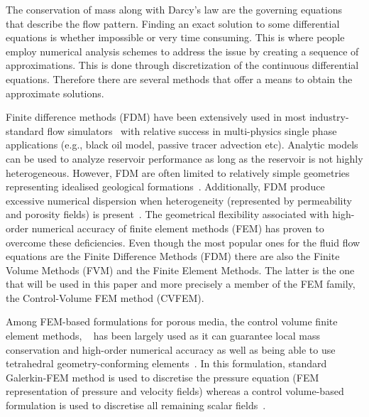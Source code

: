 \documentclass[preprint,authoryear,12pt]{elsarticle}
\begin{document}
\medskip
The conservation of mass along with Darcy's law are the governing equations that describe the flow pattern. Finding an exact solution to some differential  equations is whether impossible or very time consuming. This is where people employ numerical analysis schemes to address the issue by creating a sequence  of approximations. This is done through discretization of the continuous differential equations. Therefore there are several methods that offer a means to obtain the approximate solutions.

\medskip 
Finite difference methods (FDM) have been extensively used in most industry-standard flow simulators~\citep{aziz_1986, chen_2005, chang_1990} with relative success in multi-physics single phase applications (e.g., black oil model, passive tracer advection etc). Analytic models can be used to analyze reservoir performance as long as the reservoir is not highly heterogeneous. However, FDM are often limited to relatively simple geometries 
representing idealised geological formations~\citep{mlacnik_2004, king_1999}. Additionally, FDM produce excessive numerical dispersion when heterogeneity (represented by permeability and porosity fields) is present~\citep{chavent_1986}. The geometrical flexibility associated with high-order numerical accuracy of finite element methods (FEM) has proven to overcome these deficiencies. Even though the most popular ones for the fluid flow equations are the Finite Difference Methods (FDM) there are also the Finite Volume Methods (FVM) and the Finite Element Methods. The latter is the one that will be used in this paper and more precisely a member of the FEM family, the Control-Volume FEM method (CVFEM). 

\medskip
Among FEM-based formulations for porous media, the control volume finite element methods, ~\citep[CVFEM,][]{fung_1992} has been largely used as it can guarantee local mass conservation and high-order numerical accuracy as well as being able to use tetrahedral geometry-conforming elements~\citep{forsyth_1990, geiger_2004, hurtado_2007}. In this formulation, standard Galerkin-FEM method is used to discretise the pressure equation (FEM representation of pressure and velocity fields) whereas a control volume-based formulation is used to discretise all remaining scalar fields~\citep[e.g., saturation, density, species concentration etc, see][]{gomes_book_2012}. 
\end{document}
